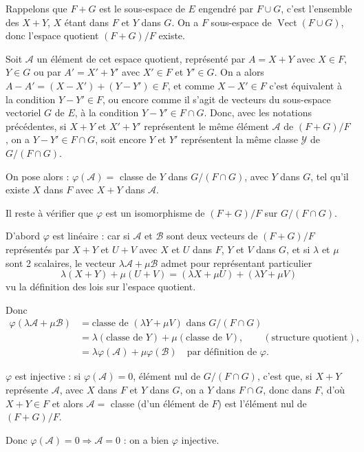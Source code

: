 Rappelons que $F+G$ est le sous-espace de $E$ engendré par $F\cup G$, c'est l'ensemble des $X+Y$, $X$ étant dans $F$ et $Y$ dans $G$. On a $F$ sous-espace de $\operatorname{Vect}(F\cup G)$, donc l'espace quotient $(F+G)/F$ existe.

Soit $\mathcal A$ un élément de cet espace quotient, représenté par $A=X+Y$ avec $X\in F$, $Y\in G$ ou par $A'=X'+Y'$ avec $X'\in F$ et $Y'\in G$. On a alors $A-A'=(X-X')+(Y-Y')\in F$, et comme $X-X'\in F$ c'est équivalent à la condition $Y-Y'\in F$, ou encore comme il s'agit de vecteurs du sous-espace vectoriel $G$ de $E$, à la condition $Y-Y'\in F\cap G$. Donc, avec les notations précédentes, si $X+Y$ et $X'+Y'$ représentent le même élément $\mathcal A$ de $(F+G)/F$, on a $Y-Y'\in F\cap G$, soit encore $Y$ et $Y'$ représentent la même classe $\mathcal Y$ de $G/(F\cap G)$.

On pose alors : $\varphi(\mathcal A)=$ classe de $Y$ dans $G/(F\cap G)$, avec $Y$ dans $G$, tel qu'il existe $X$ dans $F$ avec $X+Y$ dans $\mathcal A$.

Il reste à vérifier que $\varphi$ est un isomorphisme de $(F+G)/F$ sur $G/(F\cap G)$.

D'abord $\varphi$ est linéaire : car si $\mathcal A$ et $\mathcal B$ sont deux vecteurs de $(F+G)/F$ représentés par $X+Y$ et $U+V$ avec $X$ et $U$ dans $F$, $Y$ et $V$ dans $G$, et si $\lambda$ et $\mu$ sont 2 scalaires, le vecteur $\lambda\mathcal A+\mu\mathcal B$ admet pour représentant particulier
\[
\lambda(X+Y)+\mu(U+V)=(\lambda X+\mu U)+(\lambda Y+\mu V)
\]
vu la définition des lois sur l'espace quotient.

Donc
\begin{align*}
\varphi(\lambda\mathcal A+\mu\mathcal B)
&=\text{classe de }(\lambda Y+\mu V)\text{ dans }G/(F\cap G)\\
&=\lambda(\text{classe de }Y)+\mu(\text{classe de }V),\qquad(\text{structure quotient}),\\
&=\lambda\varphi(\mathcal A)+\mu\varphi(\mathcal B)\quad\text{par définition de }\varphi.
\end{align*}

$\varphi$ est injective : si $\varphi(\mathcal A)=0$, élément nul de $G/(F\cap G)$, c'est que, si $X+Y$ représente $\mathcal A$, avec $X$ dans $F$ et $Y$ dans $G$, on a $Y$ dans $F\cap G$, donc dans $F$, d'où $X+Y\in F$ et alors $\mathcal A=$ classe (d'un élément de $F$) est l'élément nul de $(F+G)/F$.

Donc $\varphi(\mathcal A)=0\Rightarrow\mathcal A=0$ : on a bien $\varphi$ injective.

